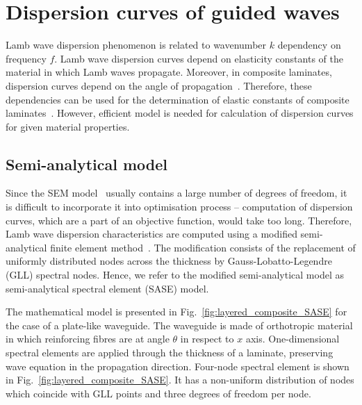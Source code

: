 \documentclass[preprint,12pt]{elsarticle}
\begin{document}
\section{Dispersion curves of guided waves \label{sec:dispersion_curves}}
Lamb wave dispersion phenomenon is related to wavenumber $k$ dependency on frequency $f$. 
Lamb wave dispersion curves depend on elasticity constants of the material in which Lamb waves propagate. 
Moreover, in composite laminates, dispersion curves depend on the angle of propagation~\cite{Rose1999}. 
Therefore, these dependencies can be used for the determination of elastic constants of composite laminates~\cite{Kudela2020}.
However, efficient model is needed for calculation of dispersion curves for given material properties.

\subsection{Semi-analytical model}
Since the SEM model~\cite{Kudela2020a} usually contains a large number of degrees of freedom, it is difficult to incorporate it into optimisation process – computation of dispersion curves, which are a part of an objective function, would take too long. 
Therefore, Lamb wave dispersion characteristics are computed using a modified semi-analytical finite element method~\cite{Bartoli2006,Marzani2008}. 
The modification consists of the replacement of uniformly distributed nodes across the thickness by Gauss-Lobatto-Legendre (GLL) spectral nodes. 
Hence, we refer to the modified semi-analytical model as semi-analytical spectral element (SASE) model.
	
The mathematical model is presented in Fig.~\ref{fig:layered_composite_SASE} for the case of a plate-like waveguide.  
The waveguide is made of orthotropic material in which reinforcing fibres are at angle $\theta$ in respect to $x$ axis.
One-dimensional spectral elements are applied through the thickness of a laminate, preserving wave equation in the propagation direction.  
Four-node spectral element is shown in Fig.~\ref{fig:layered_composite_SASE}. 
It has a non-uniform distribution of nodes which coincide with GLL points and three degrees of freedom per node.
	
\end{document}
